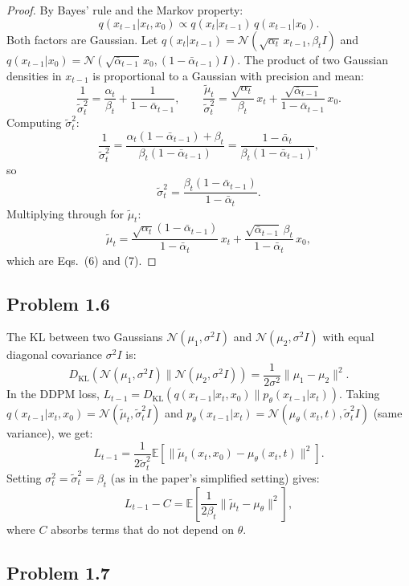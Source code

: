 \documentclass[11pt]{article}
\begin{document}
\begin{proof}
By Bayes' rule and the Markov property:
\[
q(x_{t-1}|x_t, x_0) \propto q(x_t|x_{t-1})\, q(x_{t-1}|x_0).
\]
Both factors are Gaussian. Let $q(x_t|x_{t-1}) = \mathcal{N}(\sqrt{\alpha_t}\,x_{t-1}, \beta_t I)$ and $q(x_{t-1}|x_0) = \mathcal{N}(\sqrt{\bar\alpha_{t-1}}\,x_0, (1-\bar\alpha_{t-1})I)$. The product of two Gaussian densities in $x_{t-1}$ is proportional to a Gaussian with precision and mean:
\[
\frac{1}{\tilde\sigma_t^2} = \frac{\alpha_t}{\beta_t} + \frac{1}{1-\bar\alpha_{t-1}}, \qquad
\frac{\tilde\mu_t}{\tilde\sigma_t^2} = \frac{\sqrt{\alpha_t}}{\beta_t}\,x_t + \frac{\sqrt{\bar\alpha_{t-1}}}{1-\bar\alpha_{t-1}}\,x_0.
\]
Computing $\tilde\sigma_t^2$:
\[
\frac{1}{\tilde\sigma_t^2} = \frac{\alpha_t(1-\bar\alpha_{t-1}) + \beta_t}{\beta_t(1-\bar\alpha_{t-1})} = \frac{1-\bar\alpha_t}{\beta_t(1-\bar\alpha_{t-1})},
\]
so
\[
\tilde\sigma_t^2 = \frac{\beta_t(1-\bar\alpha_{t-1})}{1-\bar\alpha_t}.
\]
Multiplying through for $\tilde\mu_t$:
\[
\tilde\mu_t = \frac{\sqrt{\alpha_t}(1-\bar\alpha_{t-1})}{1-\bar\alpha_t}\,x_t + \frac{\sqrt{\bar\alpha_{t-1}}\,\beta_t}{1-\bar\alpha_t}\,x_0,
\]
which are Eqs.~(6) and (7).
\end{proof}

\subsection*{Problem 1.6}

The KL between two Gaussians $\mathcal{N}(\mu_1, \sigma^2 I)$ and $\mathcal{N}(\mu_2, \sigma^2 I)$ with equal diagonal covariance $\sigma^2 I$ is:
\[
D_\mathrm{KL}(\mathcal{N}(\mu_1, \sigma^2 I) \| \mathcal{N}(\mu_2, \sigma^2 I)) = \frac{1}{2\sigma^2}\|\mu_1 - \mu_2\|^2.
\]
In the DDPM loss, $L_{t-1} = D_\mathrm{KL}(q(x_{t-1}|x_t, x_0) \| p_\theta(x_{t-1}|x_t))$. Taking $q(x_{t-1}|x_t,x_0) = \mathcal{N}(\tilde\mu_t, \tilde\sigma_t^2 I)$ and $p_\theta(x_{t-1}|x_t) = \mathcal{N}(\mu_\theta(x_t,t), \tilde\sigma_t^2 I)$ (same variance), we get:
\[
L_{t-1} = \frac{1}{2\tilde\sigma_t^2}\mathbb{E}\!\left[\|\tilde\mu_t(x_t, x_0) - \mu_\theta(x_t, t)\|^2\right].
\]
Setting $\sigma_t^2 = \tilde\sigma_t^2 = \beta_t$ (as in the paper's simplified setting) gives:
\[
L_{t-1} - C = \mathbb{E}\left[\frac{1}{2\beta_t}\|\tilde\mu_t - \mu_\theta\|^2\right],
\]
where $C$ absorbs terms that do not depend on $\theta$.

\subsection*{Problem 1.7}
\end{document}
